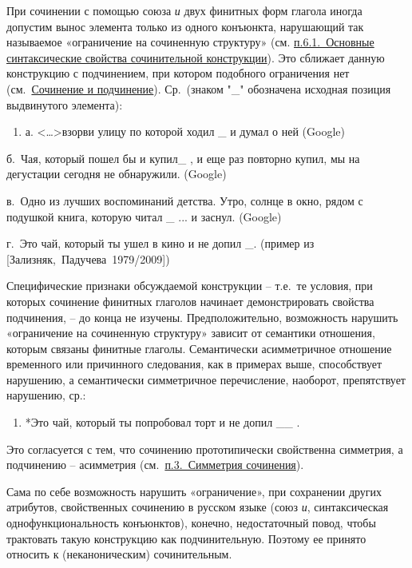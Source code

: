 При сочинении с помощью союза \emph{и} двух финитных форм глагола иногда
допустим вынос элемента только из одного конъюнкта, нарушающий так
называемое «ограничение на сочиненную структуру» (см.
\underline{п.6.1.~Основные синтаксические свойства сочинительной
конструкции}). Это сближает данную конструкцию с подчинением, при
котором подобного ограничения нет (см.~\underline{Сочинение и
подчинение}). Ср.~(знаком "\_" обозначена исходная позиция выдвинутого
элемента):

\begin{enumerate}
\def\labelenumi{(\arabic{enumi})}
\setcounter{enumi}{55}
\item
  а. \textless\ldots\textgreater взорви улицу по которой ходил \_ и
  думал о ней (Google)
\end{enumerate}

б.~Чая, который пошел бы и купил\_ , и еще раз повторно купил, мы на
дегустации сегодня не обнаружили. (Google)

в.~Одно из лучших воспоминаний детства. Утро, солнце в окно, рядом с
подушкой книга, которую читал \_ ... и заснул. (Google)

г.~Это чай, который ты ушел в кино и не допил \_. (пример из
{[}Зализняк,~Падучева~1979/2009{]})

Специфические признаки обсуждаемой конструкции -- т.е.~те условия, при
которых сочинение финитных глаголов начинает демонстрировать свойства
подчинения, -- до конца не изучены. Предположительно, возможность
нарушить «ограничение на сочиненную структуру» зависит от семантики
отношения, которым связаны финитные глаголы. Семантически асимметричное
отношение временного или причинного следования, как в примерах выше,
способствует нарушению, а семантически симметричное перечисление,
наоборот, препятствует нарушению, ср.:

\begin{enumerate}
\def\labelenumi{(\arabic{enumi})}
\setcounter{enumi}{56}
\item
  *Это чай, который ты попробовал торт и не допил \_\_ .
\end{enumerate}

Это согласуется с тем, что сочинению прототипически свойственна
симметрия, а подчинению -- асимметрия (см.~\underline{п.3.~Симметрия
сочинения}).

Сама по себе возможность нарушить «ограничение», при сохранении других
атрибутов, свойственных сочинению в русском языке (союз \emph{и},
синтаксическая однофункциональность конъюнктов), конечно, недостаточный
повод, чтобы трактовать такую конструкцию как подчинительную. Поэтому ее
принято относить к (неканоническим) сочинительным.

